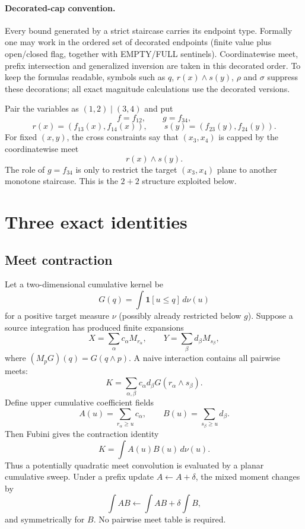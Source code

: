 \documentclass[12pt,a4paper]{article}
\theoremstyle{definition}
\newcommand{\1}{\mathbf 1}
\newcommand{\meet}{\wedge}
\begin{document}
\paragraph{Decorated-cap convention.}
Every bound generated by a strict staircase carries its endpoint type.  Formally one may work in the ordered set of decorated endpoints (finite value plus open/closed flag, together with EMPTY/FULL sentinels).  Coordinatewise meet, prefix intersection and generalized inversion are taken in this decorated order.  To keep the formulas readable, symbols such as $q$, $r(x)\wedge s(y)$, $\rho$ and $\sigma$ suppress these decorations; all exact magnitude calculations use the decorated versions.

Pair the variables as $(1,2)\mid(3,4)$ and put
\[
f=f_{12},\qquad g=f_{34},
\]
\[
r(x)=(f_{13}(x),f_{14}(x)),\qquad
s(y)=(f_{23}(y),f_{24}(y)).
\]
For fixed $(x,y)$, the cross constraints say that $(x_3,x_4)$ is capped by the coordinatewise meet
\[
r(x)\meet s(y).
\]
The role of $g=f_{34}$ is only to restrict the target $(x_3,x_4)$ plane to another monotone staircase. This is the $2+2$ structure exploited below.

\section{Three exact identities}

\subsection{Meet contraction}

Let a two-dimensional cumulative kernel be
\[
G(q)=\int \1[u\le q] \,d\nu(u)
\]
for a positive target measure $\nu$ (possibly already restricted below $g$). Suppose a source integration has produced finite expansions
\[
X=\sum_\alpha c_\alpha M_{r_\alpha},\qquad
Y=\sum_\beta d_\beta M_{s_\beta},
\]
where $(M_pG)(q)=G(q\meet p)$. A naive interaction contains all pairwise meets:
\[
K=\sum_{\alpha,\beta}c_\alpha d_\beta G(r_\alpha\meet s_\beta).
\]
Define upper cumulative coefficient fields
\[
A(u)=\sum_{r_\alpha\ge u}c_\alpha,
\qquad
B(u)=\sum_{s_\beta\ge u}d_\beta.
\]
Then Fubini gives the contraction identity
\begin{equation}
\boxed{K=\int A(u)B(u)\,d\nu(u).}                              \label{eq:meetcontract}
\end{equation}
Thus a potentially quadratic meet convolution is evaluated by a planar cumulative sweep. Under a prefix update $A\leftarrow A+\delta$, the mixed moment changes by
\[
\int AB\leftarrow\int AB+\delta\int B,
\]
and symmetrically for $B$. No pairwise meet table is required.
\end{document}
